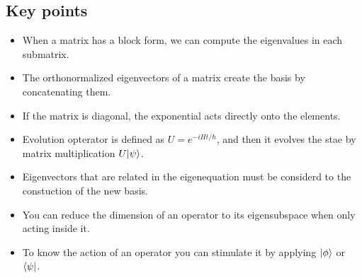 \subsection*{Key points}
\begin{itemize}[itemsep=0pt,topsep=0pt]
    \item When a matrix has a block form, we can compute the eigenvalues in each submatrix.
    \item The orthonormalized eigenvectors of a matrix create the basis by concatenating them.
    \item If the matrix is diagonal, the exponential acts directly onto the elements.
    \item Evolution opterator is defined as $U=e^{-iHt/\hbar}$, and then it evolves the stae by matrix multiplication $U|\psi\rangle$.
    \item Eigenvectors that are related in the eigenequation must be considerd to the constuction of the new basis.
    \item You can reduce the dimension of an operator to its eigensubspace when only acting inside it.
    \item To know the action of an operator you can stimulate it by applying $|\phi\rangle$ or $\langle\psi|$.
\end{itemize}